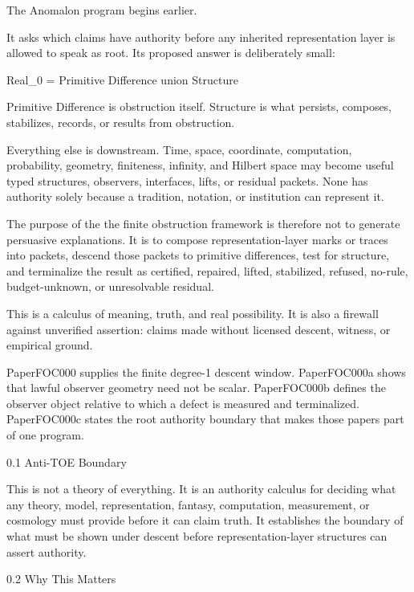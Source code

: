 \documentclass[
  10pt,
]{article}
\newenvironment{Shaded}{}{}
\newcommand{\NormalTok}[1]{#1}
\begin{document}
The Anomalon program begins earlier.

It asks which claims have authority before any inherited representation layer is allowed to speak as root. Its proposed answer is deliberately small:

\begin{Shaded}
\begin{Highlighting}[]
\NormalTok{Real\_0 = Primitive Difference union Structure}
\end{Highlighting}
\end{Shaded}

Primitive Difference is obstruction itself. Structure is what persists, composes, stabilizes, records, or results from obstruction.

Everything else is downstream. Time, space, coordinate, computation, probability, geometry, finiteness, infinity, and Hilbert space may become useful typed structures, observers, interfaces, lifts, or residual packets. None has authority solely because a tradition, notation, or institution can represent it.

The purpose of the the finite obstruction framework is therefore not to generate persuasive explanations. It is to compose representation-layer marks or traces into packets, descend those packets to primitive differences, test for structure, and terminalize the result as certified, repaired, lifted, stabilized, refused, no-rule, budget-unknown, or unresolvable residual.

This is a calculus of meaning, truth, and real possibility. It is also a firewall against unverified assertion: claims made without licensed descent, witness, or empirical ground.

PaperFOC000 supplies the finite degree-1 descent window. PaperFOC000a shows that lawful observer geometry need not be scalar. PaperFOC000b defines the observer object relative to which a defect is measured and terminalized. PaperFOC000c states the root authority boundary that makes those papers part of one program.

0.1 Anti-TOE Boundary

This is not a theory of everything. It is an authority calculus for deciding what any theory, model, representation, fantasy, computation, measurement, or cosmology must provide before it can claim truth. It establishes the boundary of what must be shown under descent before representation-layer structures can assert authority.

0.2 Why This Matters
\end{document}
